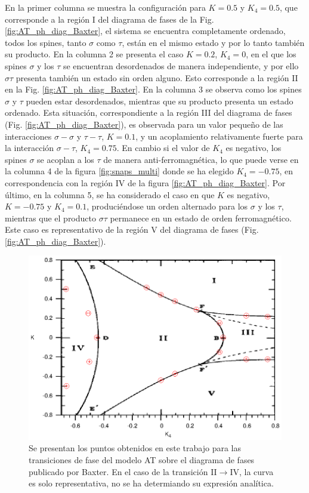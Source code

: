 En la primer columna se muestra la configuración para $K=0.5$ y $K_{4}=0.5$, que corresponde a la región I del diagrama de fases de
 la Fig. \ref{fig:AT_ph_diag_Baxter}, el sistema se encuentra completamente ordenado, todos los spines, tanto $\sigma$ como $\tau$, están en el mismo estado y
 por lo tanto también su producto.
En la columna 2 se presenta el caso $K=0.2$, $K_{4}=0$, en el que los spines $\sigma$ y los $\tau$ se encuentran desordenados de manera independiente,
 y por ello $\sigma\tau$ presenta también un estado sin orden alguno. Esto corresponde a la región II en la Fig. \ref{fig:AT_ph_diag_Baxter}.
En la columna 3 se observa como los spines $\sigma$ y $\tau$ pueden estar desordenados, mientras que su producto presenta un estado ordenado. Esta
 situación, correspondiente a la región III del diagrama de fases (Fig. \ref{fig:AT_ph_diag_Baxter}), es observada para un valor pequeño de las
 interacciones $\sigma-\sigma$ y $\tau-\tau$, $K=0.1$, y un acoplamiento relativamente fuerte para la interacción $\sigma-\tau$, $K_{4}=0.75$.
En cambio si el valor de $K_{4}$ es negativo, los spines $\sigma$ se acoplan a los $\tau$ de manera anti-ferromagnética, lo que puede verse en
 la columna 4 de la figura \ref{fig:snaps_multi} donde se ha elegido $K_{4}=-0.75$, en correspondencia con la región IV de la figura \ref{fig:AT_ph_diag_Baxter}.
Por último, en la columna 5, se ha considerado el caso en que $K$ es negativo, $K=-0.75$ y $K_{4}=0.1$, produciéndose un orden alternado para los $\sigma$ y los $\tau$,
 mientras que el producto $\sigma\tau$ permanece en un estado de orden ferromagnético. Este caso es representativo de la región V del diagrama de fases (Fig. \ref{fig:AT_ph_diag_Baxter}).\\

\begin{figure}[h!]
	\begin{center}
		\includegraphics[scale=1]{graf/phases/new_phase_diag_back.eps}
	\end{center}
	\caption{Se presentan los puntos obtenidos en este trabajo para las transiciones de fase del modelo AT sobre el diagrama de fases publicado por Baxter\cite{baxter_book}.
	En el caso de la transici\'on II$\rightarrow$IV, la curva es solo representativa, no se ha determiando su expresi\'on anal\'itica.}
	\label{fig:phase_diag_back}
\end{figure}

